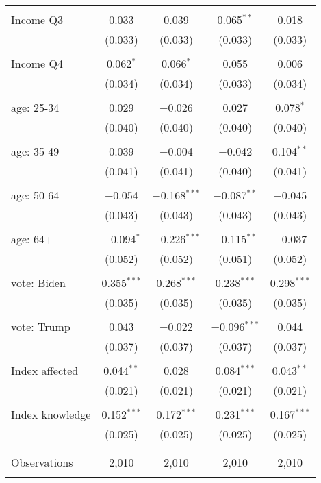 \begin{tabular}{@{\extracolsep{5pt}}lcccc}
  & & & & \\ 
 Income Q3 & 0.033 & 0.039 & 0.065$^{**}$ & 0.018 \\ 
  & (0.033) & (0.033) & (0.033) & (0.033) \\ 
  & & & & \\ 
 Income Q4 & 0.062$^{*}$ & 0.066$^{*}$ & 0.055 & 0.006 \\ 
  & (0.034) & (0.034) & (0.033) & (0.034) \\ 
  & & & & \\ 
 age: 25-34 & 0.029 & $-$0.026 & 0.027 & 0.078$^{*}$ \\ 
  & (0.040) & (0.040) & (0.040) & (0.040) \\ 
  & & & & \\ 
 age: 35-49 & 0.039 & $-$0.004 & $-$0.042 & 0.104$^{**}$ \\ 
  & (0.041) & (0.041) & (0.040) & (0.041) \\ 
  & & & & \\ 
 age: 50-64 & $-$0.054 & $-$0.168$^{***}$ & $-$0.087$^{**}$ & $-$0.045 \\ 
  & (0.043) & (0.043) & (0.043) & (0.043) \\ 
  & & & & \\ 
 age: 64+ & $-$0.094$^{*}$ & $-$0.226$^{***}$ & $-$0.115$^{**}$ & $-$0.037 \\ 
  & (0.052) & (0.052) & (0.051) & (0.052) \\ 
  & & & & \\ 
 vote: Biden & 0.355$^{***}$ & 0.268$^{***}$ & 0.238$^{***}$ & 0.298$^{***}$ \\ 
  & (0.035) & (0.035) & (0.035) & (0.035) \\ 
  & & & & \\ 
 vote: Trump & 0.043 & $-$0.022 & $-$0.096$^{***}$ & 0.044 \\ 
  & (0.037) & (0.037) & (0.037) & (0.037) \\ 
  & & & & \\ 
 Index affected & 0.044$^{**}$ & 0.028 & 0.084$^{***}$ & 0.043$^{**}$ \\ 
  & (0.021) & (0.021) & (0.021) & (0.021) \\ 
  & & & & \\ 
 Index knowledge & 0.152$^{***}$ & 0.172$^{***}$ & 0.231$^{***}$ & 0.167$^{***}$ \\ 
  & (0.025) & (0.025) & (0.025) & (0.025) \\ 
  & & & & \\ 
\hline \\[-1.8ex] 

Observations & 2,010 & 2,010 & 2,010 & 2,010 \\ 
\hline 
\hline \\[-1.8ex] 
\end{tabular} 